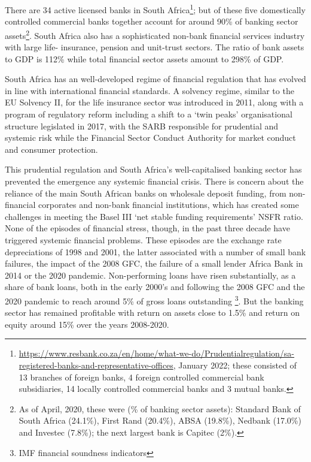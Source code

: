 \documentclass[
]{article}
\begin{document}
There are 34 active licensed banks in South Africa\footnote{\url{https://www.resbank.co.za/en/home/what-we-do/Prudentialregulation/sa-registered-banks-and-representative-offices}, January 2022; these consisted of 13 branches of foreign banks, 4 foreign controlled commercial bank subsidiaries, 14 locally controlled commercial banks and 3 mutual banks.}; but of these five domestically controlled commercial banks together account for around 90\% of banking sector assets\footnote{As of April, 2020, these were (\% of banking sector assets): Standard Bank of South Africa (24.1\%), First Rand (20.4\%), ABSA (19.8\%), Nedbank (17.0\%) and Investec (7.8\%); the next largest bank is Capitec (2\%).}. South Africa also has a sophisticated non-bank financial services industry with large life- insurance, pension and unit-trust sectors. The ratio of bank assets to GDP is 112\% while total financial sector assets amount to 298\% of GDP.

South Africa has an well-developed regime of financial regulation that has evolved in line with international financial standards. A solvency regime, similar to the EU Solvency II, for the life insurance sector was introduced in 2011, along with a program of regulatory reform including a shift to a `twin peaks' organisational structure legislated in 2017, with the SARB responsible for prudential and systemic risk while the Financial Sector Conduct Authority for market conduct and consumer protection.

This prudential regulation and South Africa's well-capitalised banking sector has prevented the emergence any systemic financial crisis. There is concern about the reliance of the main South African banks on wholesale deposit funding, from non-financial corporates and non-bank financial institutions, which has created some challenges in meeting the Basel III `net stable funding requirements' NSFR ratio. None of the episodes of financial stress, though, in the past three decade have triggered systemic financial problems. These episodes are the exchange rate depreciations of 1998 and 2001, the latter associated with a number of small bank failures, the impact of the 2008 GFC, the failure of a small lender Africa Bank in 2014 or the 2020 pandemic. Non-performing loans have risen substantially, as a share of bank loans, both in the early 2000's and following the 2008 GFC and the 2020 pandemic to reach around 5\% of gross loans outstanding \footnote{IMF financial soundness indicators}. But the banking sector has remained profitable with return on assets close to 1.5\% and return on equity around 15\% over the years 2008-2020.
\end{document}
